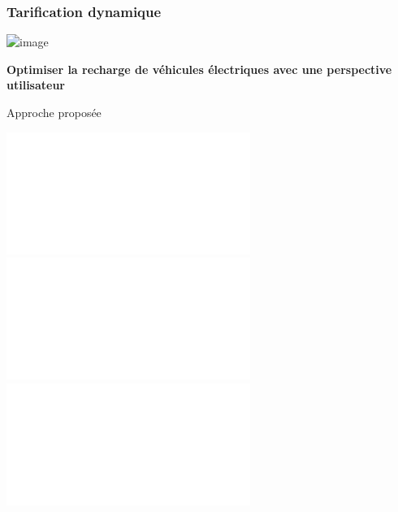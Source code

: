 \documentclass[french]{beamer}
\begin{document}
{\begin{frame}
\begin{columns}[T]
\begin{column}[T]{0.5\linewidth}  %
\begin{overlayarea}{0.95\linewidth}{2.8in}
\end{overlayarea}
\end{column}
\end{columns}
\end{frame}


\begin{frame}
\begin{center}
\frametitle{Tarification dynamique}
\includegraphics<1>[width=\linewidth]{hydroquebec.jpg}
\end{center}
\end{frame}

{
\begin{frame}
\begin{center}
\huge \textbf{Optimiser la recharge de véhicules électriques avec une perspective utilisateur}
\end{center}
\end{frame}
}
\addtocounter{framenumber}{-1}


\begin{frame}{Approche proposée}
\begin{center}
\begin{overlayarea}{\linewidth}{2.8in}
\includegraphics<1 | handout:0>[width=0.9\linewidth]{FigGralMeth01.pdf}
\includegraphics<2 | handout:0>[width=0.9\linewidth]{FigGralMeth02.pdf}
\includegraphics<3>[width=0.9\linewidth]{FigGralMeth03.pdf}
\end{overlayarea}
\end{center}
\end{frame}

}
\end{document}
